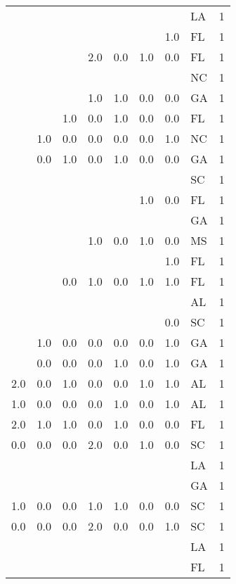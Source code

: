 \begin{tabular}{llllllllr}
    &     &     &     &     &     &     & LA &     1 \\
    &     &     &     &     &     & 1.0 & FL &     1 \\
    &     &     & 2.0 & 0.0 & 1.0 & 0.0 & FL &     1 \\
    &     &     &     &     &     &     & NC &     1 \\
    &     &     & 1.0 & 1.0 & 0.0 & 0.0 & GA &     1 \\
    &     & 1.0 & 0.0 & 1.0 & 0.0 & 0.0 & FL &     1 \\
    & 1.0 & 0.0 & 0.0 & 0.0 & 0.0 & 1.0 & NC &     1 \\
    & 0.0 & 1.0 & 0.0 & 1.0 & 0.0 & 0.0 & GA &     1 \\
    &     &     &     &     &     &     & SC &     1 \\
    &     &     &     &     & 1.0 & 0.0 & FL &     1 \\
    &     &     &     &     &     &     & GA &     1 \\
    &     &     & 1.0 & 0.0 & 1.0 & 0.0 & MS &     1 \\
    &     &     &     &     &     & 1.0 & FL &     1 \\
    &     & 0.0 & 1.0 & 0.0 & 1.0 & 1.0 & FL &     1 \\
    &     &     &     &     &     &     & AL &     1 \\
    &     &     &     &     &     & 0.0 & SC &     1 \\
    & 1.0 & 0.0 & 0.0 & 0.0 & 0.0 & 1.0 & GA &     1 \\
    & 0.0 & 0.0 & 0.0 & 1.0 & 0.0 & 1.0 & GA &     1 \\
2.0 & 0.0 & 1.0 & 0.0 & 0.0 & 1.0 & 1.0 & AL &     1 \\
1.0 & 0.0 & 0.0 & 0.0 & 1.0 & 0.0 & 1.0 & AL &     1 \\
2.0 & 1.0 & 1.0 & 0.0 & 1.0 & 0.0 & 0.0 & FL &     1 \\
0.0 & 0.0 & 0.0 & 2.0 & 0.0 & 1.0 & 0.0 & SC &     1 \\
    &     &     &     &     &     &     & LA &     1 \\
    &     &     &     &     &     &     & GA &     1 \\
1.0 & 0.0 & 0.0 & 1.0 & 1.0 & 0.0 & 0.0 & SC &     1 \\
0.0 & 0.0 & 0.0 & 2.0 & 0.0 & 0.0 & 1.0 & SC &     1 \\
    &     &     &     &     &     &     & LA &     1 \\
    &     &     &     &     &     &     & FL &     1 \\

\end{tabular}
